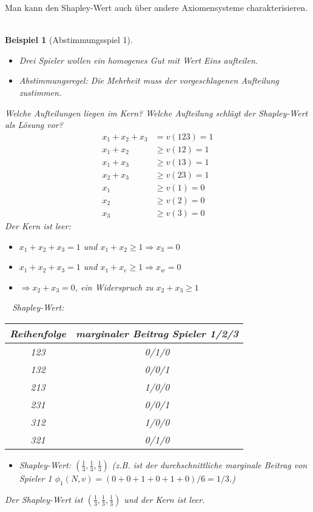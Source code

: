 \documentclass[12pt]{extreport} %
\theoremstyle{named}
\theoremstyle{itshape}
\theoremstyle{normal}
\newtheorem{beispiel}[unnamedtheorem]{Beispiel}
\begin{document}
Man kann den Shapley-Wert auch über andere Axiomensysteme charakterisieren.
~\newpage
\begin{beispiel}[Abstimmungsspiel 1] ~\
	\begin{itemize}
		\item Drei Spieler wollen ein homogenes Gut mit Wert Eins aufteilen. 
		\item Abstimmungsregel: Die Mehrheit muss der vorgeschlagenen Aufteilung zustimmen.
	\end{itemize}
	Welche Aufteilungen liegen im Kern? Welche Aufteilung schlägt der Shapley-Wert als Lösung vor?
	\begin{align*}
		x_1 + x_2 + x_3 & = v(123) = 1 \\
		x_1 + x_2 & \geq v(12) = 1 \\
		x_1 + x_3 & \geq v(13) = 1 \\
		x_2 + x_3 & \geq v(23) = 1 \\
		x_1 & \geq v(1) = 0 \\
		x_2 & \geq v(2) = 0 \\
		x_3 & \geq v(3) = 0 		
	\end{align*}
	Der Kern ist leer: 
	\begin{itemize}
		\item $x_1 + x_2 + x_3 = 1$ und $x_1 + x_2 \geq 1 \Rightarrow x_3 = 0$
		\item $x_1 + x_2 + x_3 = 1$ und $x_1 + x_e \geq 1 \Rightarrow x_w = 0$
		\item $\Rightarrow x_2 + x_3 = 0$, ein Widerspruch zu $x_2 + x_3 \geq 1$
	\end{itemize} ~\newpage
	Shapley-Wert: ~\\
	  \begin{figure*}[h!] \centering
		\begin{tabular}{cc}
  			\hline
  				Reihenfolge & marginaler Beitrag Spieler 1/2/3 \\
  			\hline
  				123 & 0/1/0 \\
  				132 & 0/0/1 \\
  				213 & 1/0/0 \\
  				231 & 0/0/1 \\
  				312 & 1/0/0 \\
  				321 & 0/1/0 \\
  			\hline
		\end{tabular}
	\end{figure*}
	\begin{itemize}
		\item Shapley-Wert: $\left( \frac{1}{3}, \frac{1}{3}, \frac{1}{3} \right)$ (z.B. ist der durchschnittliche marginale Beitrag von Spieler 1 $\phi_1(N, v) = (0+0+1+0+1+0)/6 = 1/3$.)
	\end{itemize}
	Der Shapley-Wert ist $\left( \frac{1}{3}, \frac{1}{3}, \frac{1}{3} \right)$ und der Kern ist leer.
\end{beispiel}
\end{document}
